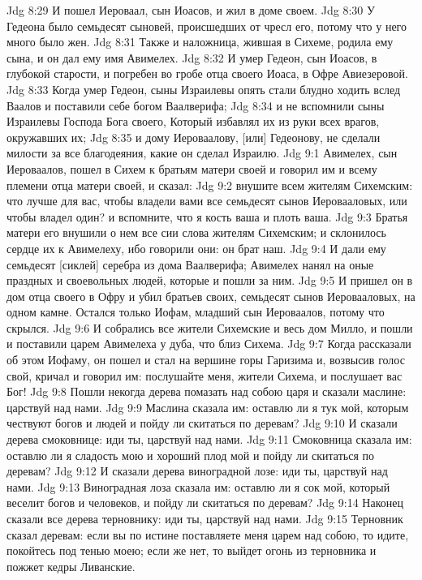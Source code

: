 Jdg 8:29  И пошел Иероваал, сын Иоасов, и жил в доме своем.
Jdg 8:30  У Гедеона было семьдесят сыновей, происшедших от чресл его, потому что у него много было жен.
Jdg 8:31  Также и наложница, жившая в Сихеме, родила ему сына, и он дал ему имя Авимелех.
Jdg 8:32  И умер Гедеон, сын Иоасов, в глубокой старости, и погребен во гробе отца своего Иоаса, в Офре Авиезеровой.
Jdg 8:33  Когда умер Гедеон, сыны Израилевы опять стали блудно ходить вслед Ваалов и поставили себе богом Ваалверифа;
Jdg 8:34  и не вспомнили сыны Израилевы Господа Бога своего, Который избавлял их из руки всех врагов, окружавших их;
Jdg 8:35  и дому Иероваалову, [или] Гедеонову, не сделали милости за все благодеяния, какие он сделал Израилю.
Jdg 9:1  Авимелех, сын Иероваалов, пошел в Сихем к братьям матери своей и говорил им и всему племени отца матери своей, и сказал:
Jdg 9:2  внушите всем жителям Сихемским: что лучше для вас, чтобы владели вами все семьдесят сынов Иеровааловых, или чтобы владел один? и вспомните, что я кость ваша и плоть ваша.
Jdg 9:3  Братья матери его внушили о нем все сии слова жителям Сихемским; и склонилось сердце их к Авимелеху, ибо говорили они: он брат наш.
Jdg 9:4  И дали ему семьдесят [сиклей] серебра из дома Ваалверифа; Авимелех нанял на оные праздных и своевольных людей, которые и пошли за ним.
Jdg 9:5  И пришел он в дом отца своего в Офру и убил братьев своих, семьдесят сынов Иеровааловых, на одном камне. Остался только Иофам, младший сын Иероваалов, потому что скрылся.
Jdg 9:6  И собрались все жители Сихемские и весь дом Милло, и пошли и поставили царем Авимелеха у дуба, что близ Сихема.
Jdg 9:7  Когда рассказали об этом Иофаму, он пошел и стал на вершине горы Гаризима и, возвысив голос свой, кричал и говорил им: послушайте меня, жители Сихема, и послушает вас Бог!
Jdg 9:8  Пошли некогда дерева помазать над собою царя и сказали маслине: царствуй над нами.
Jdg 9:9  Маслина сказала им: оставлю ли я тук мой, которым чествуют богов и людей и пойду ли скитаться по деревам?
Jdg 9:10  И сказали дерева смоковнице: иди ты, царствуй над нами.
Jdg 9:11  Смоковница сказала им: оставлю ли я сладость мою и хороший плод мой и пойду ли скитаться по деревам?
Jdg 9:12  И сказали дерева виноградной лозе: иди ты, царствуй над нами.
Jdg 9:13  Виноградная лоза сказала им: оставлю ли я сок мой, который веселит богов и человеков, и пойду ли скитаться по деревам?
Jdg 9:14  Наконец сказали все дерева терновнику: иди ты, царствуй над нами.
Jdg 9:15  Терновник сказал деревам: если вы по истине поставляете меня царем над собою, то идите, покойтесь под тенью моею; если же нет, то выйдет огонь из терновника и пожжет кедры Ливанские.
